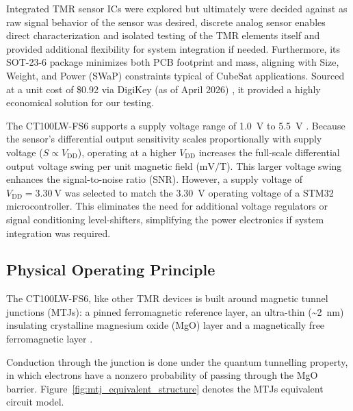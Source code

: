 \documentclass[12pt,a4paper]{article}
\begin{document}
Integrated TMR sensor ICs were explored but ultimately were decided against as raw signal behavior of the sensor was desired,  discrete analog sensor enables direct characterization and isolated testing of the TMR elements itself and provided additional flexibility for system integration if needed. Furthermore, its SOT-23-6 package minimizes both PCB footprint and mass, aligning with  Size, Weight, and Power (SWaP) constraints typical of CubeSat applications. Sourced at a unit cost of \$0.92 via DigiKey (as of April 2026) \cite{digikey_ct100}, it provided a highly economical solution for our testing.

The \mbox{CT100LW-FS6} supports a supply voltage range of \SI{1.0}{\volt} to \SI{5.5}{\volt} \cite{ct100_datasheet}. Because the sensor's differential output sensitivity scales proportionally with supply voltage ($S \propto V_{\text{DD}}$), operating at a higher $V_{\text{DD}}$ increases the full-scale differential output voltage swing per unit magnetic field ($\text{mV/T}$). This larger voltage swing enhances the signal-to-noise ratio (SNR). However, a supply voltage of $V_{\text{DD}} = \SI{3.30}{\volt}$ was selected to match the \SI{3.30}{\volt} operating voltage of a STM32 microcontroller. This eliminates the need for additional voltage regulators or signal conditioning level-shifters, simplifying the power electronics if system integration was required.

\subsection{Physical Operating Principle}
\label{sec:ct100-principle}

The CT100LW-FS6, like other TMR devices is built around magnetic tunnel junctions (MTJs): a pinned ferromagnetic reference layer, an ultra-thin (\textasciitilde\SI{2}{\nano\metre}) insulating crystalline magnesium oxide (MgO) layer and a magnetically free ferromagnetic layer \cite{parkin2004,yuasa2004}. 

Conduction through the junction is done under the quantum tunnelling property, in which electrons have a nonzero probability of passing through the MgO barrier. Figure~\ref{fig:mtj_equivalent_structure} denotes the MTJs equivalent circuit model.
\end{document}
